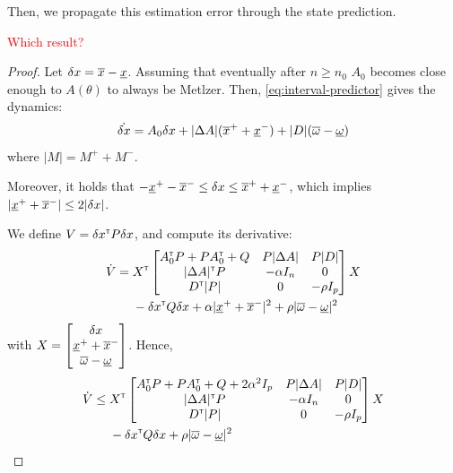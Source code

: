 \documentclass{article}
\newcommand{\todo}[1]{\textcolor{red}{#1}}
\begin{document}
Then, we propagate this estimation error through the state prediction.

\begin{lemma}
	\todo{Which result?}
\end{lemma}
\begin{proof}
Let $\delta x = \overline{x} - \underline{x}$. Assuming that eventually after $n\geq n_0$ $A_0$ becomes close enough to $A(\theta)$ to always be Metlzer. Then, \eqref{eq:interval-predictor} gives the dynamics:
\begin{align*}
\dot{\delta x} = A_0\delta x + |\Delta A|(\overline{x}^+ + \underline{x}^-) + |D|(\overline{\omega} - \underline{\omega})
\end{align*}
where $|M| = M^+ + M^-$.

Moreover, it holds that $-\underline{x}^+ -\overline{x}^- \leq \delta x \leq \overline{x}^+ + \underline{x}^-$, which implies $|\underline{x}^+ + \overline{x}^-| \leq 2 |\delta x|$.

We define $V = \delta x^{\mathsf{\scriptscriptstyle T}} P \delta x$, and compute its derivative:
\begin{align*}
\dot{V} ={}& X^{\mathsf{\scriptscriptstyle T}}
\begin{bmatrix}
A_0^{\mathsf{\scriptscriptstyle T}} P + P A_0^{\mathsf{\scriptscriptstyle T}} + Q & P|\Delta A| & P|D|\\
|\Delta A|^{\mathsf{\scriptscriptstyle T}} P & -\alpha I_n & 0\\
D^{\mathsf{\scriptscriptstyle T}}|P| & 0 & -\rho I_p
\end{bmatrix}
X\\
& - \delta x^{\mathsf{\scriptscriptstyle T}} Q \delta x + \alpha |\underline{x}^+ + \overline{x}^-|^2 + \rho |\overline{\omega} - \underline{\omega}|^2
\end{align*}
with $X=\begin{bmatrix}
\delta x\\ \underline{x}^+ + \overline{x}^- \\ \overline{\omega} - \underline{\omega}
\end{bmatrix}$. Hence, 
\begin{align*}
\dot{V} \leq {}& X^{\mathsf{\scriptscriptstyle T}}
\begin{bmatrix}
A_0^{\mathsf{\scriptscriptstyle T}} P + P A_0^{\mathsf{\scriptscriptstyle T}} + Q + 2\alpha^2 I_p & P|\Delta A| & P|D|\\
|\Delta A|^{\mathsf{\scriptscriptstyle T}} P & -\alpha I_n & 0\\
D^{\mathsf{\scriptscriptstyle T}}|P| & 0 & -\rho I_p
\end{bmatrix}
X\\
& - \delta x^{\mathsf{\scriptscriptstyle T}} Q \delta x + \rho |\overline{\omega} - \underline{\omega}|^2
\end{align*}

\end{proof}
\end{document}
